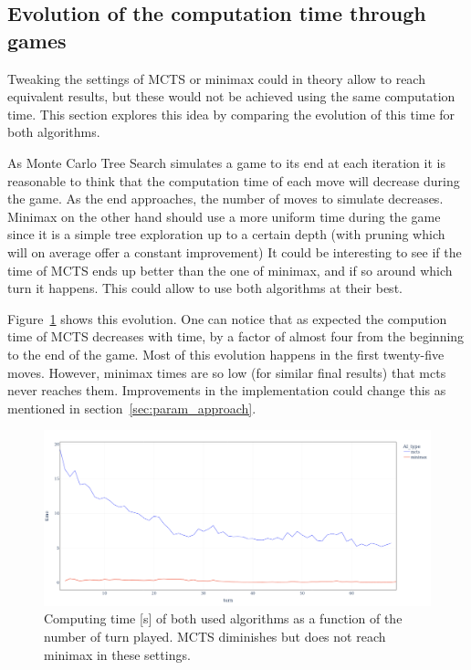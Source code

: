 \subsection{Evolution of the computation time through games}
Tweaking the settings of MCTS or minimax could in theory allow to reach equivalent results, but these would not be achieved using the same computation time.
This section explores this idea by comparing the evolution of this time for both algorithms.

As Monte Carlo Tree Search simulates a game to its end at each iteration it is reasonable to think that the computation
time of each move will decrease during the game.
As the end approaches, the number of moves to simulate decreases.
Minimax on the other hand should use a more uniform time during the game since it is a simple tree exploration up to a certain depth (with pruning which will on average offer a constant improvement)
It could be interesting to see if the time of MCTS ends up better than the one of minimax, and if so around which turn it happens.
This could allow to use both algorithms at their best.

Figure~\ref{fig:benchmark-time_turn} shows this evolution.
One can notice that as expected the compution time of MCTS decreases with time, by a factor of almost four from the beginning to the end of the game.
Most of this evolution happens in the first twenty-five moves. 
However, minimax times are so low (for similar final results) that mcts never reaches them. 
Improvements in the implementation could change this as mentioned in section~\ref{sec:param_approach}.

\begin{figure}[ht]
    \centering
    \includegraphics[width=\linewidth]{avg_time_per_turn}
    \caption{Computing time [s] of both used algorithms as a function of the number of turn played.
    MCTS diminishes but does not reach minimax in these settings.}
    \label{fig:benchmark-time_turn}
\end{figure}